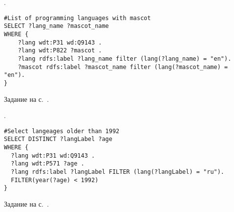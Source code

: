 \begin{task}
    \label{answer:prog_langs_4}
    . 
	\begin{lstlisting}[language=SPARQL, caption={{\href{https://w.wiki/v4e}{<<Персонажи-талисманы>> языков программирования}}\protect\footnotemark}, label=lst:prog_lang_answer_4]
#List of programming languages with mascot
SELECT ?lang_name ?mascot_name
WHERE {
    ?lang wdt:P31 wd:Q9143 .
    ?lang wdt:P822 ?mascot .
    ?lang rdfs:label ?lang_name filter (lang(?lang_name) = "en").
    ?mascot rdfs:label ?mascot_name filter (lang(?mascot_name) = "en").
}
	\end{lstlisting}
    
    \small{Задание на с.~\pageref{prog_lang_test}.}
\end{task}




\newpage
\begin{task}
    \label{answer:prog_langs_5}
    . 
	\begin{lstlisting}[language=SPARQL, caption={{\href{https://w.wiki/v4f}{Языки программирования, старше 1992 года}}\protect\footnotemark}, label=lst:prog_lang_answer_5]
#Select langeages older than 1992
SELECT DISTINCT ?langLabel ?age
WHERE {
  ?lang wdt:P31 wd:Q9143 .
  ?lang wdt:P571 ?age .
  ?lang rdfs:label ?langLabel FILTER (lang(?langLabel) = "ru").
  FILTER(year(?age) < 1992)
}
\end{lstlisting}
    
\small{Задание на с.~\pageref{prog_lang_test}.}
\end{task}

